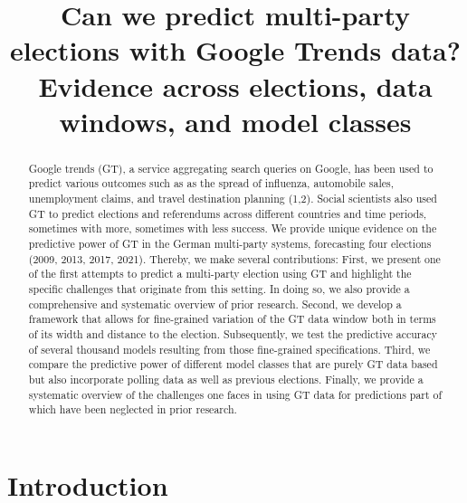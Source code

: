\documentclass[
  letterpaper,
  DIV=11,
  numbers=noendperiod]{scrartcl}
\title{Can we predict multi-party elections with Google Trends data?
Evidence across elections, data windows, and model classes}
\author{}
\date{}
\begin{document}
\maketitle
\begin{abstract}
Google trends (GT), a service aggregating search queries on Google, has
been used to predict various outcomes such as as the spread of
influenza, automobile sales, unemployment claims, and travel destination
planning (1,2). Social scientists also used GT to predict elections and
referendums across different countries and time periods, sometimes with
more, sometimes with less success. We provide unique evidence on the
predictive power of GT in the German multi-party systems, forecasting
four elections (2009, 2013, 2017, 2021). Thereby, we make several
contributions: First, we present one of the first attempts to predict a
multi-party election using GT and highlight the specific challenges that
originate from this setting. In doing so, we also provide a
comprehensive and systematic overview of prior research. Second, we
develop a framework that allows for fine-grained variation of the GT
data window both in terms of its width and distance to the election.
Subsequently, we test the predictive accuracy of several thousand models
resulting from those fine-grained specifications. Third, we compare the
predictive power of different model classes that are purely GT data
based but also incorporate polling data as well as previous elections.
Finally, we provide a systematic overview of the challenges one faces in
using GT data for predictions part of which have been neglected in prior
research.
\end{abstract}
\ifdefined\Shaded\renewenvironment{Shaded}{\begin{tcolorbox}[frame hidden, interior hidden, enhanced, sharp corners, boxrule=0pt, borderline west={3pt}{0pt}{shadecolor}, breakable]}{\end{tcolorbox}}\fi

\newpage

\hypertarget{introduction}{%
\section{Introduction}\label{introduction}}
\end{document}
